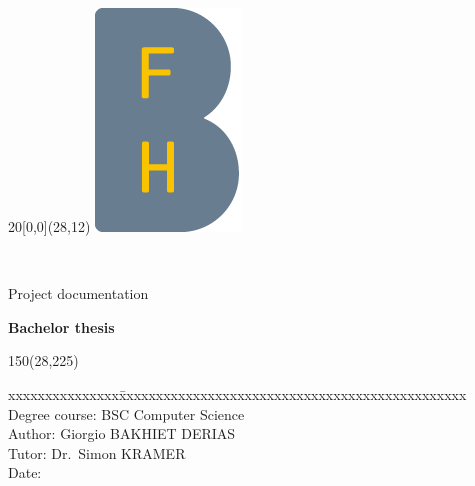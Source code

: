 \begin{titlepage}


\setlength{\unitlength}{1mm}
\begin{textblock}{20}[0,0](28,12)
	\includegraphics[scale=1.0]{images/BFH_Logo_B.png}
\end{textblock}

\begin{flushleft}

\vspace*{21mm}

\fontsize{26pt}{40pt}\selectfont 
\heading				\\							%
\vspace{2mm}

\fontsize{16pt}{24pt}\selectfont\vspace{0.3em}
Project documentation  			\\				%
\vspace{5mm}

\fontsize{12pt}{12pt}\selectfont
\textbf{Bachelor thesis} \\		%
\vspace{7mm}


\begin{textblock}{150}(28,225)
\fontsize{12pt}{17pt}\selectfont
\begin{tabbing}
xxxxxxxxxxxxxxx\=xxxxxxxxxxxxxxxxxxxxxxxxxxxxxxxxxxxxxxxxxxxxxxx \kill
Degree course:	\> BSC Computer Science	\\		%
Author:		\> Giorgio BAKHIET DERIAS 		\\	%
Tutor:	\> Dr.~Simon KRAMER		\\							%
Date:			\> \versiondate					\\							%
\end{tabbing}


\end{textblock}
\end{flushleft}
\end{titlepage}
